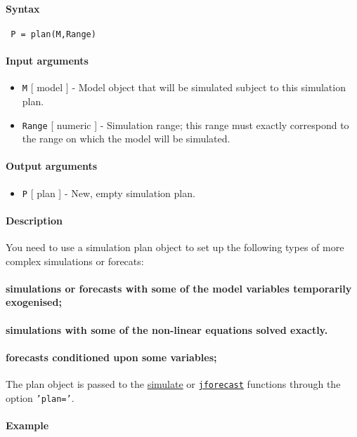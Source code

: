 


	\paragraph{Syntax}
 
 \begin{verbatim}
 P = plan(M,Range)
 \end{verbatim}
 
 \paragraph{Input arguments}
 
 \begin{itemize}
 \item
   \texttt{M} {[} model {]} - Model object that will be simulated subject
   to this simulation plan.
 \item
   \texttt{Range} {[} numeric {]} - Simulation range; this range must
   exactly correspond to the range on which the model will be simulated.
 \end{itemize}
 
 \paragraph{Output arguments}
 
 \begin{itemize}
 \item
   \texttt{P} {[} plan {]} - New, empty simulation plan.
 \end{itemize}
 
 \paragraph{Description}
 
 You need to use a simulation plan object to set up the following types
 of more complex simulations or forecats:
 
 \paragraph{simulations or forecasts with some of the model variables
 temporarily exogenised;}
 
 \paragraph{simulations with some of the non-linear equations solved
 exactly.}
 
 \paragraph{forecasts conditioned upon some variables;}
 
 The plan object is passed to the \href{model/simulate}{simulate} or
 \href{model/jforecast}{\texttt{jforecast}} functions through the option
 \texttt{'plan='}.
 
 \paragraph{Example}


